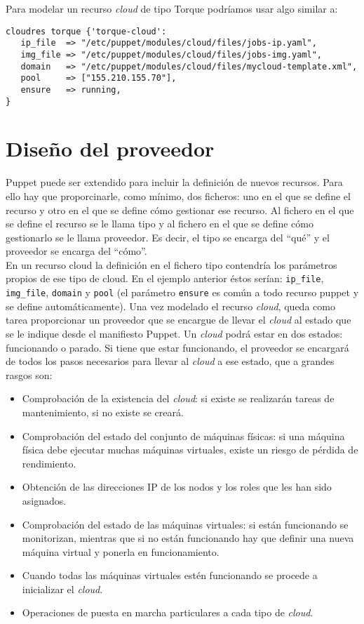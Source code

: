 Para modelar un recurso \emph{cloud} de tipo Torque podríamos usar algo similar a:
\begin{lstlisting}
cloudres torque {'torque-cloud':
   ip_file  => "/etc/puppet/modules/cloud/files/jobs-ip.yaml",
   img_file => "/etc/puppet/modules/cloud/files/jobs-img.yaml",
   domain   => "/etc/puppet/modules/cloud/files/mycloud-template.xml",
   pool     => ["155.210.155.70"],
   ensure   => running,
}
\end{lstlisting}


\section{Diseño del proveedor}

Puppet puede ser extendido para incluir la definición de nuevos recursos. Para ello hay que proporcinarle, como mínimo, dos ficheros: uno en el que se define el recurso y otro en el que se define cómo gestionar ese recurso. Al fichero en el que se define el recurso se le llama tipo y al fichero en el que se define cómo gestionarlo se le llama proveedor. Es decir, el tipo se encarga del ``qué'' y el proveedor se encarga del ``cómo''.\\

En un recurso cloud la definición en el fichero tipo contendría los parámetros propios de ese tipo de cloud. En el ejemplo anterior éstos serían: \texttt{ip\_file}, \texttt{img\_file}, \texttt{domain} y \texttt{pool} (el parámetro \texttt{ensure} es común a todo recurso puppet y se define automáticamente). Una vez modelado el recurso \emph{cloud}, queda como tarea proporcionar un proveedor que se encargue de llevar el \emph{cloud} al estado que se le indique desde el manifiesto Puppet. Un \emph{cloud} podrá estar en dos estados: funcionando o parado. Si tiene que estar funcionando, el proveedor se encargará de todos los pasos necesarios para llevar al \emph{cloud} a ese estado, que a grandes rasgos son:
\begin{itemize}
\item Comprobación de la existencia del \emph{cloud}: si existe se realizarán tareas de mantenimiento, si no existe se creará.
\item Comprobación del estado del conjunto de máquinas físicas: si una máquina física debe ejecutar muchas máquinas virtuales, existe un riesgo de pérdida de rendimiento.
\item Obtención de las direcciones IP de los nodos y los roles que les han sido asignados.
\item Comprobación del estado de las máquinas virtuales: si están funcionando se monitorizan, mientras que si no están funcionando hay que definir una nueva máquina virtual y ponerla en funcionamiento.
\item Cuando todas las máquinas virtuales estén funcionando se procede a inicializar el \emph{cloud}.
\item Operaciones de puesta en marcha particulares a cada tipo de \emph{cloud}.
\end{itemize}

